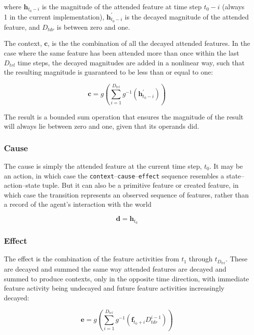 where $ \mathbf{h}_{t_0-i} $ is the magnitude of the attended feature at time step $t_0-i$ (always 1 in the current implementation), $\mathbf{h}^\prime_{t_0-i}$ is the decayed magnitude of the attended feature, and $D_{tdr}$ is between zero and one.

The context, $\mathbf{c}$, is the the combination of all the decayed attended features. In the case where the same feature has been attended more than once within the last $D_{trl}$ time steps, the decayed magnitudes are added in a nonlinear way, such that the resulting magnitude is guaranteed to be less than or equal to one: 

\begin{equation}
\mathbf{c} = g \left( \sum\limits_{i = 1} ^ {D_{trl}} g^{-1}(\mathbf{h}^\prime_{t_0-i}) \right )
\end{equation}

The result is a bounded sum operation that ensures the magnitude of the result will always lie between zero and one, given that its operands did.


\subsubsection{Cause}
The cause is simply the attended feature at the current time step, $t_0$. It may be an action, in which case the \texttt{context}--\texttt{cause}--\texttt{effect} sequence resembles a state--action--state tuple. But it can also be a primitive feature or created feature, in which case the transition represents an observed sequence of features, rather than a record of the agent's interaction with the world

\begin{equation}
\mathbf{d} = \mathbf{h}_{t_0}
\end{equation}
 
\subsubsection{Effect}
The effect is the combination of the feature activities from $t_1$ through $t_{D_{trl}}$. These are decayed and summed the same way attended features are decayed and summed to produce contexts, only in the opposite time direction, with immediate feature activity being undecayed and future feature activities increasingly decayed:

\begin{equation}
\mathbf{e} = g \left( \sum\limits_{i = 1} ^ {D_{trl}} g^{-1}(\mathbf{f}_{t_0+i} D_{tdr}^{i-1} ) \right )
\end{equation}
 

